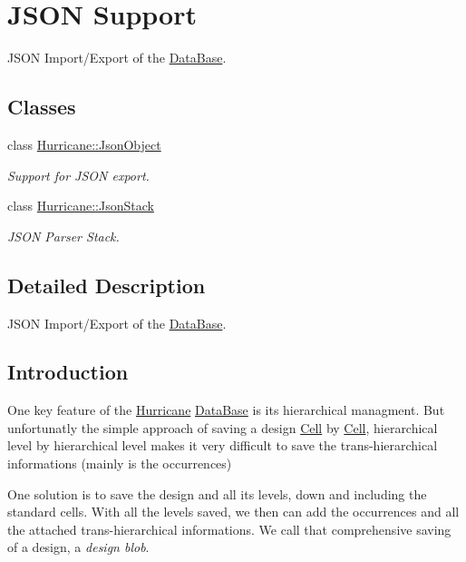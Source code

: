\hypertarget{group__JsonSupport}{}\section{J\+S\+ON Support}
\label{group__JsonSupport}


J\+S\+ON Import/\+Export of the \hyperlink{classHurricane_1_1DataBase}{Data\+Base}.  


\subsection*{Classes}
\begin{DoxyCompactItemize}
\item 
class \hyperlink{classHurricane_1_1JsonObject}{Hurricane\+::\+Json\+Object}
\begin{DoxyCompactList}\small\item\em Support for J\+S\+ON export. \end{DoxyCompactList}\item 
class \hyperlink{classHurricane_1_1JsonStack}{Hurricane\+::\+Json\+Stack}
\begin{DoxyCompactList}\small\item\em J\+S\+ON Parser Stack. \end{DoxyCompactList}\end{DoxyCompactItemize}


\subsection{Detailed Description}
J\+S\+ON Import/\+Export of the \hyperlink{classHurricane_1_1DataBase}{Data\+Base}. 

\hypertarget{group__JsonSupport_secJsonSupportIntro}{}\subsection{Introduction}\label{group__JsonSupport_secJsonSupportIntro}
One key feature of the \hyperlink{namespaceHurricane}{Hurricane} \hyperlink{classHurricane_1_1DataBase}{Data\+Base} is it\textquotesingle{}s hierarchical managment. But unfortunatly the simple approach of saving a design \hyperlink{classHurricane_1_1Cell}{Cell} by \hyperlink{classHurricane_1_1Cell}{Cell}, hierarchical level by hierarchical level makes it very difficult to save the trans-\/hierarchical informations (mainly is the occurrences)

One solution is to save the design and all it\textquotesingle{}s levels, down and including the standard cells. With all the levels saved, we then can add the occurrences and all the attached trans-\/hierarchical informations. We call that comprehensive saving of a design, a {\itshape design blob}.

